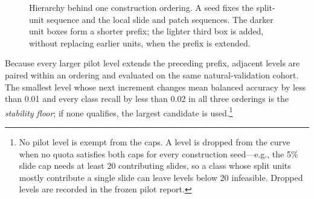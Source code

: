 \documentclass[11pt]{article}
\begin{document}
\begin{figure}[ht]
  \centering
  \caption{Hierarchy behind one construction ordering. A seed fixes the split-unit sequence and the local slide and patch sequences. The darker unit boxes form a shorter prefix; the lighter third box is added, without replacing earlier units, when the prefix is extended.}
  \label{fig:construction-hierarchy}
\end{figure}

\noindent Because every larger pilot level extends the preceding prefix, adjacent levels are paired within an ordering and evaluated on the same natural-validation cohort. The smallest level whose next increment changes mean balanced accuracy by less than \num{0.01} and every class recall by less than \num{0.02} in all three orderings is the \emph{stability floor}; if none qualifies, the largest candidate is used.\footnote{No pilot level is exempt from the caps. A level is dropped from the curve when no quota satisfies both caps for every construction seed---e.g., the \num{5}\% slide cap needs at least 20 contributing slides, so a class whose split units mostly contribute a single slide can leave levels below 20 infeasible. Dropped levels are recorded in the frozen pilot report.}
\end{document}
